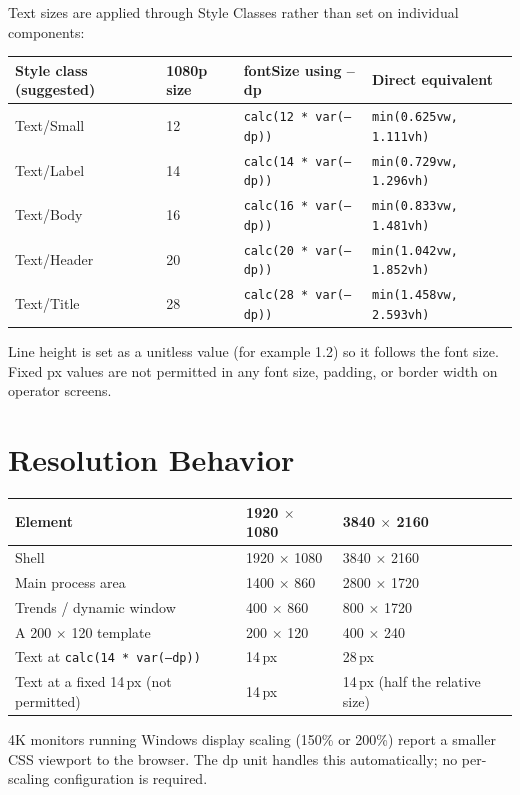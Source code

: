 Text sizes are applied through Style Classes rather than set on individual components:
\begin{center}
\begin{tabular}{@{}P{4.12cm}P{2.60cm}P{5.20cm}P{4.59cm}@{}}
\toprule
{}\textbf{Style class (suggested)} & \textbf{1080p size} & \textbf{fontSize using --dp} & \textbf{Direct equivalent} \\
\midrule
Text/Small & 12 & \texttt{calc(12 * var(--dp))} & \texttt{min(0.\allowbreak{}625vw, 1.\allowbreak{}111vh)} \\
Text/Label & 14 & \texttt{calc(14 * var(--dp))} & \texttt{min(0.\allowbreak{}729vw, 1.\allowbreak{}296vh)} \\
Text/Body & 16 & \texttt{calc(16 * var(--dp))} & \texttt{min(0.\allowbreak{}833vw, 1.\allowbreak{}481vh)} \\
Text/Header & 20 & \texttt{calc(20 * var(--dp))} & \texttt{min(1.\allowbreak{}042vw, 1.\allowbreak{}852vh)} \\
Text/Title & 28 & \texttt{calc(28 * var(--dp))} & \texttt{min(1.\allowbreak{}458vw, 2.\allowbreak{}593vh)} \\
\bottomrule
\end{tabular}
\end{center}
Line height is set as a unitless value (for example 1.2) so it follows the font size. Fixed px values are not permitted in any font size, padding, or border width on operator screens.

\section{Resolution Behavior}
\begin{center}
\begin{tabular}{@{}P{7.42cm}P{4.76cm}P{4.76cm}@{}}
\toprule
{}\textbf{Element} & \textbf{1920 $\times$ 1080} & \textbf{3840 $\times$ 2160} \\
\midrule
Shell & 1920 $\times$ 1080 & 3840 $\times$ 2160 \\
Main process area & 1400 $\times$ 860 & 2800 $\times$ 1720 \\
Trends / dynamic window & 400 $\times$ 860 & 800 $\times$ 1720 \\
A 200 $\times$ 120 template & 200 $\times$ 120 & 400 $\times$ 240 \\
Text at \texttt{calc(14 * var(--dp))} & 14\,px & 28\,px \\
Text at a fixed 14\,px (not permitted) & 14\,px & 14\,px (half the relative size) \\
\bottomrule
\end{tabular}
\end{center}
4K monitors running Windows display scaling (150\% or 200\%) report a smaller CSS viewport to the browser. The dp unit handles this automatically; no per-scaling configuration is required.

